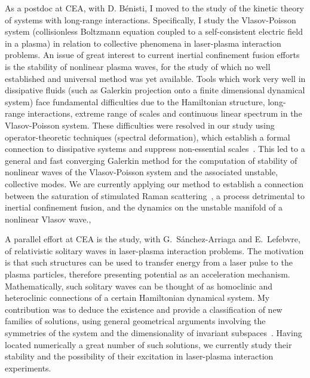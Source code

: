 \documentclass[11pt,a4paper,final]{moderncv}
\begin{document}
As a postdoc 
at CEA, with D. B\'enisti, I moved to the study of the kinetic 
theory of systems with long-range interactions. Specifically, I study  
the Vlasov-Poisson system (collisionless Boltzmann 
equation coupled to a self-consistent electric field in a plasma) in relation to 
collective phenomena in laser-plasma interaction problems. An issue of great
interest to current inertial confinement fusion efforts is the stability 
of nonlinear plasma waves, for the study of which no well established 
and universal method was yet available. 
Tools which work very well in dissipative fluids 
(such as Galerkin projection onto a finite dimensional dynamical system)
face fundamental difficulties due to the Hamiltonian
structure, long-range interactions, extreme range of scales and continuous
linear spectrum in the Vlasov-Poisson system.
These difficulties were resolved in our study using operator-theoretic
techniques (spectral deformation), which establish a formal connection to
dissipative systems and suppress non-essential scales~\cite{siminos11}. 
This led to a general and fast converging Galerkin method for the 
computation of stability 
of nonlinear waves of the Vlasov-Poisson system and the associated unstable, 
collective modes. We are currently applying our method to establish
a connection between the saturation of stimulated Raman 
scattering~\cite{benisti10-1}, 
a process detrimental to inertial confinement fusion,
and the dynamics on the unstable manifold of a nonlinear Vlasov wave.\sep

A parallel effort at CEA is the study, with G.~S\'anchez-Arriaga and 
E.~Lefebvre, of relativistic solitary waves in laser-plasma interaction 
problems. The motivation is that such structures can be used to
transfer energy from a laser pulse to the plasma particles, therefore
presenting potential as an acceleration mechanism. 
Mathematically, such solitary waves can be thought of as homoclinic
and heteroclinic connections of a certain Hamiltonian dynamical system.
My contribution was to deduce the existence and provide a classification of new
families of solutions, using general geometrical arguments 
involving the symmetries of the system and the dimensionality 
of invariant subspaces~\cite{SSL11}. Having located numerically a great number of such
solutions, we currently study their stability and the possibility 
of their excitation in laser-plasma interaction experiments.
\end{document}
